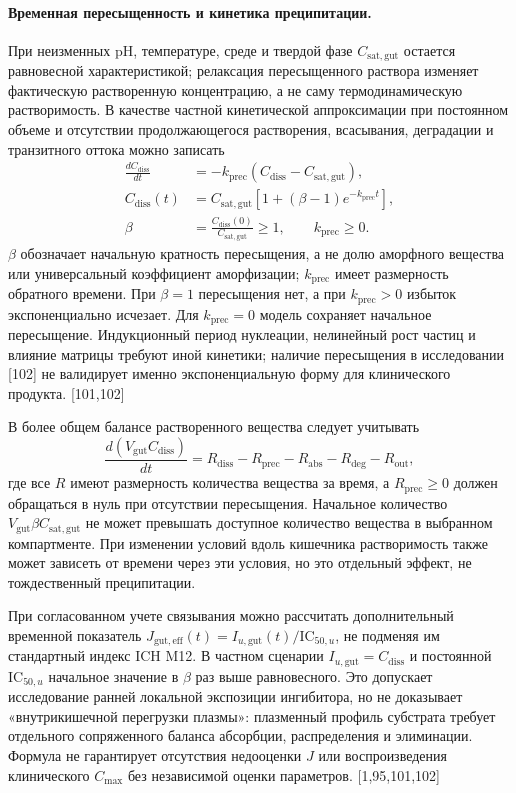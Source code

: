 \documentclass[11pt]{article}
\begin{document}
\paragraph{Временная пересыщенность и кинетика преципитации.}
При неизменных pH, температуре, среде и твердой фазе \(C_{\mathrm{sat,gut}}\) остается равновесной характеристикой; релаксация пересыщенного раствора изменяет фактическую растворенную концентрацию, а не саму термодинамическую растворимость. В качестве частной кинетической аппроксимации при постоянном объеме и отсутствии продолжающегося растворения, всасывания, деградации и транзитного оттока можно записать
\[
\begin{aligned}
\frac{dC_{\mathrm{diss}}}{dt}
&=-k_{\mathrm{prec}}\left(C_{\mathrm{diss}}-C_{\mathrm{sat,gut}}\right),\\
C_{\mathrm{diss}}(t)
&=C_{\mathrm{sat,gut}}
\left[1+(\beta-1)e^{-k_{\mathrm{prec}}t}\right],\\
\beta&=\frac{C_{\mathrm{diss}}(0)}{C_{\mathrm{sat,gut}}}\geq1,
\qquad k_{\mathrm{prec}}\geq0.
\end{aligned}
\]
\(\beta\) обозначает начальную кратность пересыщения, а не долю аморфного вещества или универсальный коэффициент аморфизации; \(k_{\mathrm{prec}}\) имеет размерность обратного времени. При \(\beta=1\) пересыщения нет, а при \(k_{\mathrm{prec}}>0\) избыток экспоненциально исчезает. Для \(k_{\mathrm{prec}}=0\) модель сохраняет начальное пересыщение. Индукционный период нуклеации, нелинейный рост частиц и влияние матрицы требуют иной кинетики; наличие пересыщения в исследовании [102] не валидирует именно экспоненциальную форму для клинического продукта. [101,102]

В более общем балансе растворенного вещества следует учитывать
\[
\frac{d(V_{\mathrm{gut}}C_{\mathrm{diss}})}{dt}
=R_{\mathrm{diss}}-R_{\mathrm{prec}}-R_{\mathrm{abs}}
-R_{\mathrm{deg}}-R_{\mathrm{out}},
\]
где все \(R\) имеют размерность количества вещества за время, а \(R_{\mathrm{prec}}\geq0\) должен обращаться в нуль при отсутствии пересыщения. Начальное количество \(V_{\mathrm{gut}}\beta C_{\mathrm{sat,gut}}\) не может превышать доступное количество вещества в выбранном компартменте. При изменении условий вдоль кишечника растворимость также может зависеть от времени через эти условия, но это отдельный эффект, не тождественный преципитации.

При согласованном учете связывания можно рассчитать дополнительный временной показатель \(J_{\mathrm{gut,eff}}(t)=I_{u,\mathrm{gut}}(t)/\mathrm{IC}_{50,u}\), не подменяя им стандартный индекс ICH M12. В частном сценарии \(I_{u,\mathrm{gut}}=C_{\mathrm{diss}}\) и постоянной \(\mathrm{IC}_{50,u}\) начальное значение в \(\beta\) раз выше равновесного. Это допускает исследование ранней локальной экспозиции ингибитора, но не доказывает «внутрикишечной перегрузки плазмы»: плазменный профиль субстрата требует отдельного сопряженного баланса абсорбции, распределения и элиминации. Формула не гарантирует отсутствия недооценки \(J\) или воспроизведения клинического \(C_{\max}\) без независимой оценки параметров. [1,95,101,102]
\end{document}
